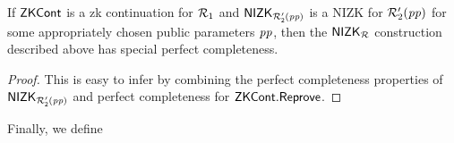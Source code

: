 \begin{lemma} 
\label{le:specialCompl_for_nizkR}
If ${\mathsf{ZKCont}}$ is a zk continuation for $\mathcal{R}_1$ and ${\mathsf{NIZK_{\mathcal{R}'_2(\mathit{pp})}}}$ is a NIZK for $\mathcal{R}_2'(\mathit{pp})$ for some appropriately chosen public parameters $\mathit{pp}$, 
then the ${\mathsf{NIZK_{\mathcal{R}}}}$ construction described above has special perfect completeness.
\end{lemma} 
\begin{proof} This is easy to infer by combining the perfect completeness properties of ${\mathsf{NIZK_{\mathcal{R}'_2(\mathit{pp})}}}$ and perfect completeness 
for ${\mathsf{ZKCont}}.{\mathsf{Reprove}}$.
\end{proof}

\noindent Finally, we define \\
\begin{comment} 
\noindent \textbf{Perfect Zero-knowledge after Reusing a $\ZKCont$ Proof} For all $\lambda \in \mathbb{N}$, for every benign auxiliary input $aux$, 
for all $\bary,\barx,\barz, \baromega_1, \baromega_2$ with $(\bary, \barx; \baromega_1) \in \relone$ and $(\barz, \barx; \baromega_2) \in \reltwo$, for all $X,\pi_1,\pi_2, b$, for every adversary $A$ it holds:
\begin{align*}
\mathit{Pr}(& A(\crs, \realaux, \pi'_1,\pi_2, X', \rel) = 1 \ | \ (\crs, \tw, \pp) \leftarrow \ZKCont.\Setup (1^{\lambda}, \relone), \\
                  & (\pi'_1, X', \_) \leftarrow \ZKCont.\Reprove (\crs, X, \pi, b, \relone), \\
                  & \pi_2 \leftarrow \nizktwo.\Prove(\crstwo, X, \barz, \barx, b, \baromega_2), \\
                  &  \ZKCont.\Verify(\crs, \bary, X, \pi, \relone) = 1 
                  \wedge \VerifyCom(\pp, X, \bar{x}, b) = 1) =  \\
= \mathit{Pr}(& A(\crs, \realaux, \pi',\pi_2, X', \rel) = 1 \ | \ (\crs, \tw, \pp) \leftarrow \ZKCont.\Setup (1^{\lambda}, \relone), \\ 
                     & (\pi'_1, X',\pi_2) \leftarrow \nizkR.\Sim(\tw, \bary, \relone) \\ 
                     &  \ZKCont.\Verify(\crs, \bary, X, \pi, \relone) = 1
                    \wedge \VerifyCom(\pp, X, \bar{x}, b) = 1)
\end{align*}
\end{comment} 

